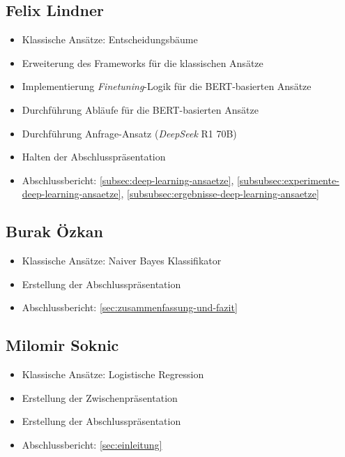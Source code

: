 \begin{multicols}{2}
\subsection{Felix Lindner}
\begin{itemize}
    \item Klassische Ansätze: Entscheidungsbäume
    \item Erweiterung des Frameworks für die klassischen Ansätze
    \item Implementierung \textit{Finetuning}-Logik für die BERT-basierten Ansätze
    \item Durchführung Abläufe für die BERT-basierten Ansätze
    \item Durchführung Anfrage-Ansatz (\textit{DeepSeek} R1 70B)
    \item Halten der Abschlusspräsentation
    \item Abschlussbericht: \ref{subsec:deep-learning-ansaetze}, \ref{subsubsec:experimente-deep-learning-ansaetze}, \ref{subsubsec:ergebnisse-deep-learning-ansaetze}
\end{itemize}

\subsection{Burak Özkan}
\begin{itemize}
    \item Klassische Ansätze: Naiver Bayes Klassifikator
    \item Erstellung der Abschlusspräsentation
    \item Abschlussbericht: \ref{sec:zusammenfassung-und-fazit}
\end{itemize}

\subsection{Milomir Soknic}
\begin{itemize}
    \item Klassische Ansätze: Logistische Regression
    \item Erstellung der Zwischenpräsentation
    \item Erstellung der Abschlusspräsentation
    \item Abschlussbericht: \ref{sec:einleitung}
\end{itemize}

\end{multicols}
